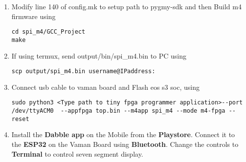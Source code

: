 \begin{enumerate}[label=\thesection.\arabic*.,ref=\thesection.\theenumi]
\item  Modify line 140 of config.mk to setup path to pygmy-sdk and then Build m4 firmware using
\begin{lstlisting}
cd spi_m4/GCC_Project
make
\end{lstlisting}

\item If using termux, send output/bin/spi{\_}m4.bin to PC using
\begin{lstlisting}
scp output/spi_m4.bin username@IPaddress:
\end{lstlisting} 

\item Connect usb cable to vaman board and Flash eos s3 soc, using
\begin{lstlisting}
sudo python3 <Type path to tiny fpga programmer application>--port /dev/ttyACM0  --appfpga top.bin --m4app spi_m4 --mode m4-fpga --reset
\end{lstlisting} 

\item Install the \textbf{Dabble app} on the Mobile from the \textbf{Playstore}. Connect it to the \textbf{ESP32} on the Vaman Board using \textbf{Bluetooth}. Change the controls to \textbf{Terminal} to control seven segment display.\\

\end{enumerate}